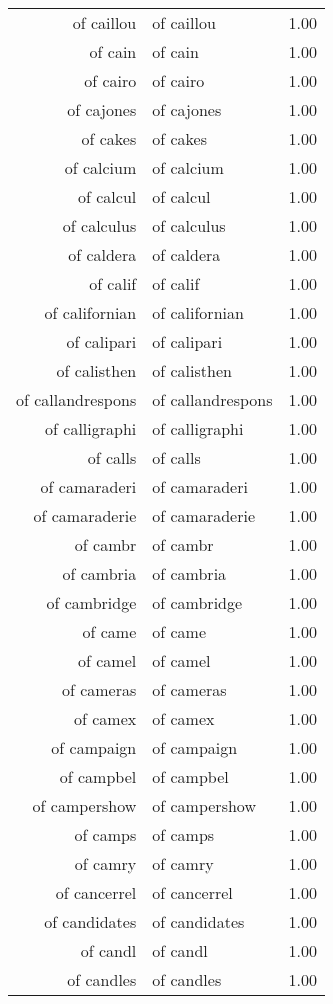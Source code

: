 \begin{table}[ht]
\begin{tabular}{rlr}
  of caillou & of caillou & 1.00 \\ 
  of cain & of cain & 1.00 \\ 
  of cairo & of cairo & 1.00 \\ 
  of cajones & of cajones & 1.00 \\ 
  of cakes & of cakes & 1.00 \\ 
  of calcium & of calcium & 1.00 \\ 
  of calcul & of calcul & 1.00 \\ 
  of calculus & of calculus & 1.00 \\ 
  of caldera & of caldera & 1.00 \\ 
  of calif & of calif & 1.00 \\ 
  of californian & of californian & 1.00 \\ 
  of calipari & of calipari & 1.00 \\ 
  of calisthen & of calisthen & 1.00 \\ 
  of callandrespons & of callandrespons & 1.00 \\ 
  of calligraphi & of calligraphi & 1.00 \\ 
  of calls & of calls & 1.00 \\ 
  of camaraderi & of camaraderi & 1.00 \\ 
  of camaraderie & of camaraderie & 1.00 \\ 
  of cambr & of cambr & 1.00 \\ 
  of cambria & of cambria & 1.00 \\ 
  of cambridge & of cambridge & 1.00 \\ 
  of came & of came & 1.00 \\ 
  of camel & of camel & 1.00 \\ 
  of cameras & of cameras & 1.00 \\ 
  of camex & of camex & 1.00 \\ 
  of campaign & of campaign & 1.00 \\ 
  of campbel & of campbel & 1.00 \\ 
  of campershow & of campershow & 1.00 \\ 
  of camps & of camps & 1.00 \\ 
  of camry & of camry & 1.00 \\ 
  of cancerrel & of cancerrel & 1.00 \\ 
  of candidates & of candidates & 1.00 \\ 
  of candl & of candl & 1.00 \\ 
  of candles & of candles & 1.00 \\ 

\end{tabular}
\end{table}
